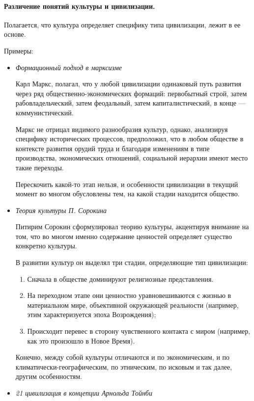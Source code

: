 \paragraph{Различение понятий культуры и цивилизации.}
Полагается, что культура определяет специфику типа цивилизации, лежит в
ее основе. 

Примеры:  
\begin{itemize}

\item \textit{Формационный подход в марксизме}

Карл Маркс, полагал, что у любой цивилизации одинаковый путь развития через
ряд общественно-экономических формаций:
первобытный строй, затем рабовладельческий, затем феодальный, затем капиталистический, 
в конце --- коммунистический. 

Маркс не отрицал видимого разнообразия культур,
однако, анализируя специфику исторических процессов, предположил, что в любом
обществе в контексте развития орудий труда и благодаря изменениям в типе
производства, экономических отношений, социальной иерархии имеют место такие
переходы. 

Перескочить какой-то этап нельзя, и особенности
цивилизации в текущий момент во многом обусловлены тем, на какой стадии
находится общество. 

\item \textit{Теория культуры П. Сорокина}

Питирим Сорокин сформулировал теорию культуры,
акцентируя внимание на том, что во
многом именно содержание ценностей определяет существо конкретно культуры. 

В развитии культур он выделял три стадии, определяющие тип цивилизации:
\begin{enumerate}
    \item Сначала в обществе доминируют религиозные представления.
    \item На переходном этапе они ценностно
    уравновешиваются с жизнью в материальном мире, объективной окружающей
    реальности (например, этим характеризуется эпоха Возрождения);
    \item Происходит перевес в сторону чувственного контакта с миром (например, как это произошло в Новое Время).
\end{enumerate}
Конечно, между собой культуры
отличаются и по экономическим, и по климатически-географическим, по этническим,
по исковым и так далее, другим особенностям. 

\item \textit{21 цивилизация в концепции Арнольда Тойнби}


\end{itemize}
